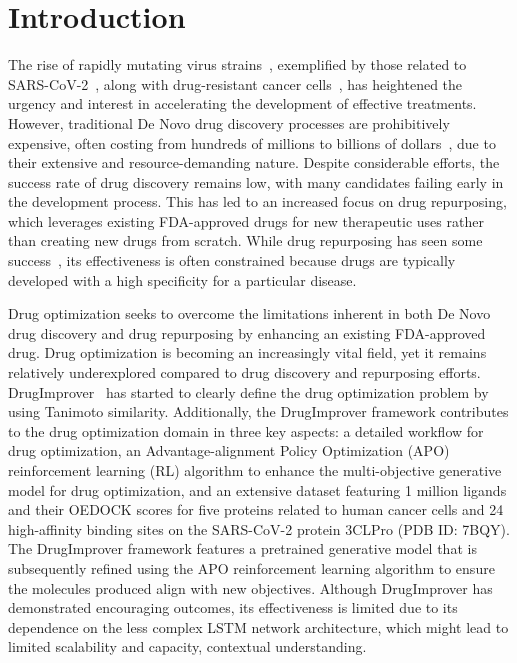 \section{Introduction}\label{sec:intro}


The rise of rapidly mutating virus strains~\citep{hadj2022covid}, exemplified by those related to SARS-CoV-2~\citep{yuki2020covid}, along with drug-resistant cancer cells~\citep{MANS2017}, has heightened the urgency and interest in accelerating the development of effective treatments. 
However, traditional De Novo drug discovery processes are prohibitively expensive, often costing from hundreds of millions to billions of dollars~\citep{dickson2009cost}, due to their extensive and resource-demanding nature. 
Despite considerable efforts, the success rate of drug discovery remains low, with many candidates failing early in the development process.
This has led to an increased focus on drug repurposing, which leverages existing FDA-approved drugs for new therapeutic uses rather than creating new drugs from scratch. While drug repurposing has seen some success~\citep{pushpakom2019drug}, its effectiveness is often constrained because drugs are typically developed with a high specificity for a particular disease.




Drug optimization seeks to overcome the limitations inherent in both De Novo drug discovery and drug repurposing by enhancing an existing FDA-approved drug.  
Drug optimization is becoming an increasingly vital field, yet it remains relatively underexplored compared to drug discovery and repurposing efforts.
DrugImprover~\citep{liu2023drugimprover} has started to clearly define the drug optimization problem by using Tanimoto similarity. 
Additionally, the DrugImprover framework contributes to the drug optimization domain in three key aspects: a detailed workflow for drug optimization, an Advantage-alignment Policy Optimization (APO) reinforcement learning (RL) algorithm to enhance the multi-objective generative model for drug optimization, and an extensive dataset featuring 1 million ligands and their OEDOCK scores for five proteins related to human cancer cells and 24 high-affinity binding sites on the SARS-CoV-2 protein 3CLPro (PDB ID: 7BQY). The DrugImprover framework features a pretrained generative model that is subsequently refined using the APO reinforcement learning algorithm to ensure the molecules produced align with new objectives. Although DrugImprover has demonstrated encouraging outcomes, its effectiveness is limited due to its dependence on the less complex LSTM network architecture, which might lead to limited scalability and capacity, contextual understanding.

